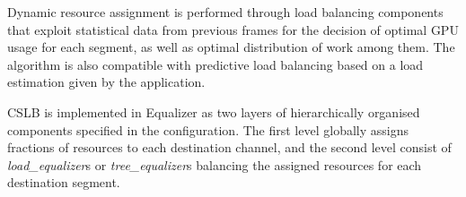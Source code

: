 Dynamic resource assignment is performed through load balancing components that
exploit statistical data from previous frames for the decision of optimal GPU
usage for each segment, as well as optimal distribution of work among them.
The algorithm is also compatible with predictive load balancing based on a load
estimation given by the application.

CSLB is implemented in Equalizer as two layers of hierarchically organised
components specified in the configuration. The first level globally assigns
fractions of resources to each destination channel, and the second level
consist of {\em load\_equalizer}s or {\em tree\_equalizer}s balancing the
assigned resources for each destination segment.

\begin{figure}[h!t] \center
  \hfill
\end{figure}
